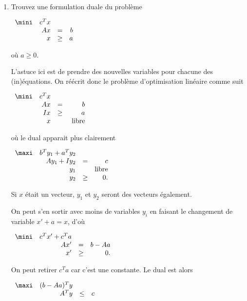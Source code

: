 \begin{enumerate}
  \item Trouvez une formulation duale du  problème

    $
    \begin{array}{lrcr}
      \mini & c^T x\\
      & A x & = &  b\\
      & x   & \geq & a
    \end{array}
    $

    où $a \geq 0$.

    \begin{solution}
      L'astuce ici est de prendre des nouvelles variables pour chacune des
      (in)équations.
      On réécrit donc le problème d'optimisation linéaire comme suit

      $
      \begin{array}{lrcr}
        \mini & c^T x\\
        & A x & = &  b\\
        & I x   & \geq & a\\
        & x & & \mbox{ libre}
      \end{array}
      $

      où le dual apparait plus clairement

      $
      \begin{array}{lrcr}
        \maxi & b^Ty_1+a^Ty_2\\
        & Ay_1 + Iy_2 & = & c\\
        & y_1 & & \text{libre}\\
        & y_2 & \geq & 0.
      \end{array}
      $

      Si $x$ était un vecteur, $y_1$ et $y_2$ seront des vecteurs également.

      On peut s'en sortir avec moins de variables $y_i$ en faisant
      le changement de variable $x' + a = x$, d'où

      $
      \begin{array}{lrcr}
        \mini & c^T x' + c^Ta\\
        & A x' & = &  b - Aa\\
        & x'   & \geq & 0.
      \end{array}
      $

      On peut retirer $c^Ta$ car c'est une constante.
      Le dual est alors

      $
      \begin{array}{lrcr}
        \maxi & (b-Aa)^Ty\\
        & A^Ty & \leq & c
      \end{array}
      $


\end{solution}
\end{enumerate}
